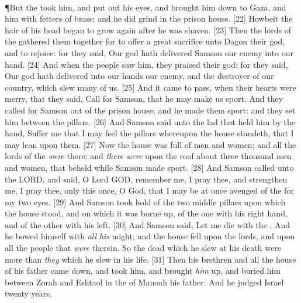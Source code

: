 \\
\P \textcolor[cmyk]{0.99998,1,0,0}{But the  took him, and put out his eyes, and brought him down to Gaza, and  him with fetters of brass; and he did grind in the prison house.}
[22] \textcolor[cmyk]{0.99998,1,0,0}{Howbeit the hair of his head began to grow again after he was shaven.}
[23] \textcolor[cmyk]{0.99998,1,0,0}{Then the lords of the  gathered them together for to offer a great sacrifice unto Dagon their god, and to rejoice: for they said, Our god hath delivered Samson our enemy into our hand.}
[24] \textcolor[cmyk]{0.99998,1,0,0}{And when the people saw him, they praised their god: for they said, Our god hath delivered into our hands our enemy, and the destroyer of our country, which slew many of us.}
[25] \textcolor[cmyk]{0.99998,1,0,0}{And it came to pass, when their hearts were merry, that they said, Call for Samson, that he may make us sport. And they called for Samson out of the prison house; and he made them sport: and they set him between the pillars.}
[26] \textcolor[cmyk]{0.99998,1,0,0}{And Samson said unto the lad that held him by the hand, Suffer me that I may feel the pillars whereupon the house standeth, that I may lean upon them.}
[27] \textcolor[cmyk]{0.99998,1,0,0}{Now the house was full of men and women; and all the lords of the  \emph{were} there; and \emph{there} \emph{were} upon the roof about three thousand men and women, that beheld while Samson made sport.}
[28] \textcolor[cmyk]{0.99998,1,0,0}{And Samson called unto the LORD, and said, O Lord GOD, remember me, I pray thee, and strengthen me, I pray thee, only this once, O God, that I may be at once avenged of the  for my two eyes.}
[29] \textcolor[cmyk]{0.99998,1,0,0}{And Samson took hold of the two middle pillars upon which the house stood, and on which it was borne up, of the one with his right hand, and of the other with his left.}
[30] \textcolor[cmyk]{0.99998,1,0,0}{And Samson said, Let me die with the . And he bowed himself with \emph{all} \emph{his} might; and the house fell upon the lords, and upon all the people that \emph{were} therein. So the dead which he slew at his death were more than \emph{they} which he slew in his life.}
[31] \textcolor[cmyk]{0.99998,1,0,0}{Then his brethren and all the house of his father came down, and took him, and brought \emph{him} up, and buried him between Zorah and Eshtaol in the  of Manoah his father. And he judged Israel twenty years.}